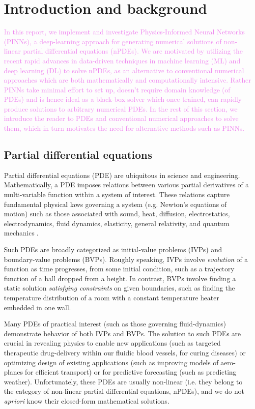 \documentclass[11pt]{article}
\newcommand{\newcontent}[1]{\textcolor{violet}{#1}}
\begin{document}
\newpage

\section{Introduction and background}
\label{sec:org40dc8b2}
\newcontent{
In this report, we implement and investigate Physics-Informed Neural Networks
(PINNs), a deep-learning approach for generating numerical solutions
of non-linear partial differential equations (nPDEs). We are motivated by utilizing
the recent rapid advances in data-driven techniques in machine learning (ML)
and deep learning (DL) to solve nPDEs, as an alternative to conventional
numerical approaches which are both mathematically and computationally
intensive. Rather PINNs take minimal effort to set up, doesn't require domain
knowledge (of PDEs) and is hence ideal as a black-box solver which once trained,
can rapidly produce solutions to arbitrary numerical PDEs. In the rest of this
section, we introduce the reader to PDEs and conventional numerical approaches to
solve them, which in turn motivates the need for alternative methods such as PINNs.
 }

\subsection{Partial differential equations}
\label{sec:org6db4771}
Partial differential equations (PDE) are ubiquitous in science and
engineering. Mathematically, a PDE imposes relations between various partial
derivatives of a multi-variable function within a system of interest. These
relations capture fundamental physical laws governing a system (e.g.
Newton's equations of motion) such as those associated with sound, heat,
diffusion, electrostatics, electrodynamics, fluid dynamics, elasticity,
general relativity, and quantum mechanics \cite{wiki:pde}.

Such PDEs are broadly categorized as initial-value problems (IVPs) and boundary-value problems
(BVPs). Roughly speaking, IVPs involve \emph{evolution} of a function as time
progresses, from some initial condition, such as a trajectory function of a ball
dropped from a height. In contrast, BVPs involve finding a static solution \emph{satisfying
constraints} on given boundaries, such as finding the temperature distribution
of a room with a constant temperature heater embedded in one wall.

Many PDEs of practical interest (such as those governing fluid-dynamics)
demonstrate behavior of both IVPs and BVPs. The solution to such PDEs are
crucial in revealing physics to enable new applications (such as
targeted therapeutic drug-delivery within our fluidic blood vessels, for
curing diseases) or optimizing design of existing applications (such as
improving models of aero-planes for efficient transport) or for predictive
forecasting (such as predicting weather). Unfortunately, these PDEs are
usually non-linear (i.e. they belong to the category of non-linear partial differential equations, nPDEs),
and we do not \emph{apriori} know their closed-form mathematical solutions.
\end{document}

